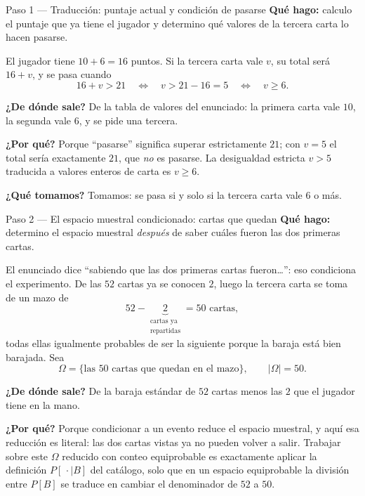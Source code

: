 \documentclass[11pt]{article}
\begin{document}
\begin{sol}

\begin{paso}{Paso 1 --- Traducci\'on: puntaje actual y condici\'on de pasarse}
\textbf{Qu\'e hago:} calculo el puntaje que ya tiene el jugador y determino qu\'e valores de la tercera carta lo hacen pasarse.

El jugador tiene $10+6=16$ puntos. Si la tercera carta vale $v$, su total ser\'a $16+v$, y se pasa cuando
\[
16+v>21
\quad\Longleftrightarrow\quad
v>21-16=5
\quad\Longleftrightarrow\quad
v\ge 6 .
\]

\textbf{¿De d\'onde sale?} De la tabla de valores del enunciado: la primera carta vale $10$, la segunda vale $6$, y se pide una tercera.

\textbf{¿Por qu\'e?} Porque ``pasarse'' significa superar estrictamente $21$; con $v=5$ el total ser\'ia exactamente $21$, que \emph{no} es pasarse. La desigualdad estricta $v>5$ traducida a valores enteros de carta es $v\ge 6$.

\textbf{¿Qu\'e tomamos?} Tomamos: se pasa si y solo si la tercera carta vale $6$ o m\'as.
\end{paso}

\begin{paso}{Paso 2 --- El espacio muestral condicionado: cartas que quedan}
\textbf{Qu\'e hago:} determino el espacio muestral \emph{despu\'es} de saber cu\'ales fueron las dos primeras cartas.

El enunciado dice ``sabiendo que las dos primeras cartas fueron\dots'': eso condiciona el experimento. De las $52$ cartas ya se conocen $2$, luego la tercera carta se toma de un mazo de
\[
52-\underbrace{2}_{\substack{\text{cartas ya}\\ \text{repartidas}}}=50 \text{ cartas},
\]
todas ellas igualmente probables de ser la siguiente porque la baraja est\'a bien barajada. Sea
\[
\Omega=\{\text{las } 50 \text{ cartas que quedan en el mazo}\},
\qquad |\Omega|=50 .
\]

\textbf{¿De d\'onde sale?} De la baraja est\'andar de $52$ cartas menos las $2$ que el jugador tiene en la mano.

\textbf{¿Por qu\'e?} Porque condicionar a un evento reduce el espacio muestral, y aqu\'i esa reducci\'on es literal: las dos cartas vistas ya no pueden volver a salir. Trabajar sobre este $\Omega$ reducido con conteo equiprobable es exactamente aplicar la definici\'on $P[\,\cdot\mid B]$ del cat\'alogo, solo que en un espacio equiprobable la divisi\'on entre $P[B]$ se traduce en cambiar el denominador de $52$ a $50$.


\end{paso}
\end{sol}
\end{document}
